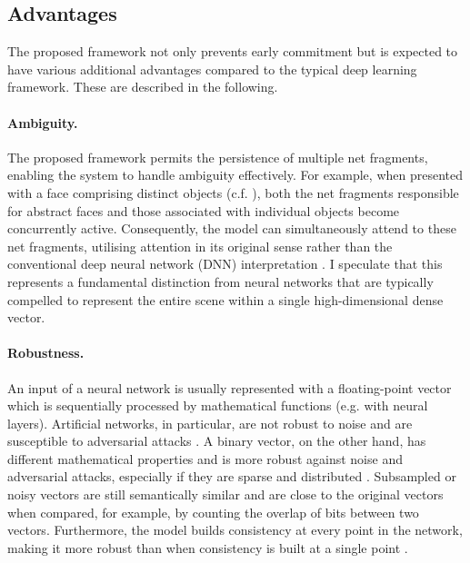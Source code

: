 \subsection{Advantages}
The proposed framework not only prevents early commitment  but is expected to have various additional advantages compared to the typical deep learning framework. These are described in the following.

\paragraph{Ambiguity.} The proposed framework permits the persistence of multiple net fragments, enabling the system to handle ambiguity effectively. For example, when presented with a face comprising distinct objects (c.f. ), both the net fragments responsible for abstract faces and those associated with individual objects become concurrently active. Consequently, the model can simultaneously attend to these net fragments, utilising attention in its original sense rather than the conventional deep neural network (DNN) interpretation . I speculate that this represents a fundamental distinction from neural networks that are typically compelled to represent the entire scene within a single high-dimensional dense vector.

\paragraph{Robustness.} An input of a neural network is usually represented with a floating-point vector which is sequentially processed by mathematical functions (e.g. with neural layers). Artificial networks, in particular, are not robust to noise and are susceptible to adversarial attacks . A binary vector, on the other hand, has different mathematical properties and is more robust against noise and adversarial attacks, especially if they are sparse and distributed .
Subsampled or noisy vectors are still semantically similar and are close to the original vectors when compared, for example, by counting the overlap of bits between two vectors.
Furthermore, the model builds consistency at every point in the network, making it more robust than when consistency is built at a single point .

